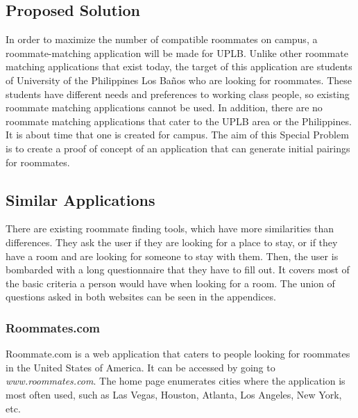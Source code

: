 \documentclass[journal]{IEEEtran}
\newcommand{\UPLB}{University of the Philippines Los Ba\~{n}os }
\begin{document}
    \subsection{Proposed Solution}
    In order to maximize the number of compatible roommates on campus, a roommate-matching application will be made for
    UPLB. Unlike other roommate matching applications that exist today, the target of this application are students of
    \UPLB who are looking for roommates. These students have different needs and preferences to working class people, so
    existing roommate matching applications cannot be used. In addition, there are no roommate matching applications
    that cater to the UPLB area or the Philippines. It is about time that one is created for campus. The aim of this
    Special Problem is to create a proof of concept of an application that can generate initial pairings for roommates.


\pubidadjcol

    \subsection{Similar Applications}
    There are existing roommate finding tools, which have more similarities than differences. They ask the user if they are
    looking for a place to stay, or if they have a room and are looking for someone to stay with them. Then, the user is
    bombarded with a long questionnaire that they have to fill out. It covers most of the basic criteria a person would have
    when looking for a room. The union of questions asked in both websites can be seen in the appendices. 

        \subsubsection{Roommates.com}
        Roommate.com\cite{roommates.com} is a web application that caters to people looking for roommates in the United States
        of America. It can be accessed by going to \textit{www.roommates.com}. The home page enumerates cities where the
        application is most often used, such as Las Vegas, Houston, Atlanta, Los Angeles, New York, etc. 
\end{document}
